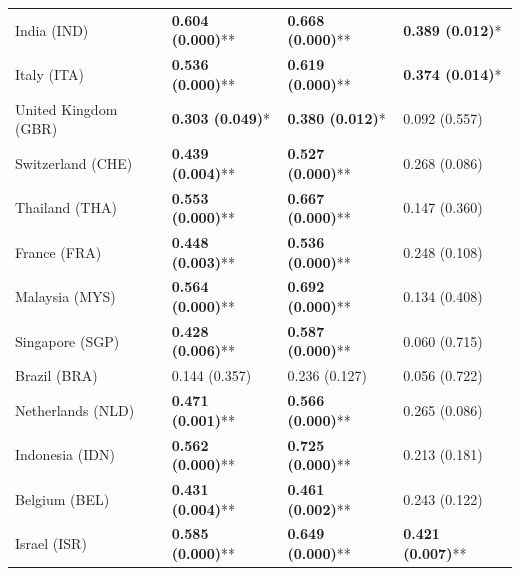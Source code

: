 \begin{longtable}{p{5cm}p{3cm}p{3cm}p{5cm}}
India (IND) & \textcolor{atlLime600}{\textbf{0.604 (0.000)}**} & \textcolor{atlLime600}{\textbf{0.668 (0.000)}**} & \textcolor{atlLime600}{\textbf{0.389 (0.012)}*} \\
Italy (ITA) & \textcolor{atlLime600}{\textbf{0.536 (0.000)}**} & \textcolor{atlLime600}{\textbf{0.619 (0.000)}**} & \textcolor{atlLime600}{\textbf{0.374 (0.014)}*} \\
United Kingdom (GBR) & \textcolor{atlLime600}{\textbf{0.303 (0.049)}*} & \textcolor{atlLime600}{\textbf{0.380 (0.012)}*} & \textcolor{atlOrange600}{0.092 (0.557)} \\
Switzerland (CHE) & \textcolor{atlLime600}{\textbf{0.439 (0.004)}**} & \textcolor{atlLime600}{\textbf{0.527 (0.000)}**} & \textcolor{atlOrange600}{0.268 (0.086)} \\
Thailand (THA) & \textcolor{atlLime600}{\textbf{0.553 (0.000)}**} & \textcolor{atlLime600}{\textbf{0.667 (0.000)}**} & \textcolor{atlOrange600}{0.147 (0.360)} \\
France (FRA) & \textcolor{atlLime600}{\textbf{0.448 (0.003)}**} & \textcolor{atlLime600}{\textbf{0.536 (0.000)}**} & \textcolor{atlOrange600}{0.248 (0.108)} \\
Malaysia (MYS) & \textcolor{atlLime600}{\textbf{0.564 (0.000)}**} & \textcolor{atlLime600}{\textbf{0.692 (0.000)}**} & \textcolor{atlOrange600}{0.134 (0.408)} \\
Singapore (SGP) & \textcolor{atlLime600}{\textbf{0.428 (0.006)}**} & \textcolor{atlLime600}{\textbf{0.587 (0.000)}**} & \textcolor{atlOrange600}{0.060 (0.715)} \\
Brazil (BRA) & \textcolor{atlOrange600}{0.144 (0.357)} & \textcolor{atlOrange600}{0.236 (0.127)} & \textcolor{atlOrange600}{0.056 (0.722)} \\
Netherlands (NLD) & \textcolor{atlLime600}{\textbf{0.471 (0.001)}**} & \textcolor{atlLime600}{\textbf{0.566 (0.000)}**} & \textcolor{atlOrange600}{0.265 (0.086)} \\
Indonesia (IDN) & \textcolor{atlLime600}{\textbf{0.562 (0.000)}**} & \textcolor{atlLime600}{\textbf{0.725 (0.000)}**} & \textcolor{atlOrange600}{0.213 (0.181)} \\
Belgium (BEL) & \textcolor{atlLime600}{\textbf{0.431 (0.004)}**} & \textcolor{atlLime600}{\textbf{0.461 (0.002)}**} & \textcolor{atlOrange600}{0.243 (0.122)} \\
Israel (ISR) & \textcolor{atlLime600}{\textbf{0.585 (0.000)}**} & \textcolor{atlLime600}{\textbf{0.649 (0.000)}**} & \textcolor{atlLime600}{\textbf{0.421 (0.007)}**} \\

\end{longtable}
